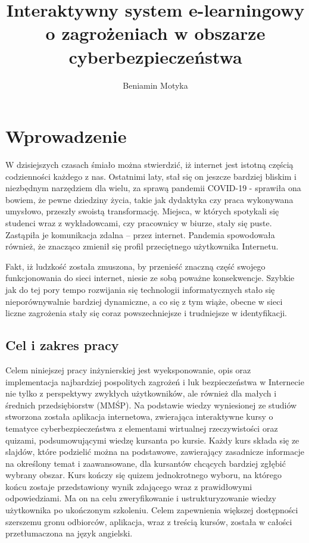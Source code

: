 \documentclass[12pt,twoside]{article}
\author{Beniamin Motyka}
\title{Interaktywny system e-learningowy o zagrożeniach w obszarze cyberbezpieczeństwa}
\begin{document}
\maketitle

\blankpage

\tableofcontents

\clearpage
\blankpage

\clearpage
\section{Wprowadzenie}

W dzisiejszych czasach śmiało można stwierdzić, iż	internet jest istotną częścią codzienności każdego z nas. Ostatnimi laty, stał się on jeszcze bardziej bliskim i niezbędnym narzędziem dla wielu, za sprawą pandemii COVID-19 - sprawiła ona bowiem, że pewne dziedziny życia, takie jak dydaktyka czy praca wykonywana umysłowo, przeszły swoistą transformację. Miejsca, w których spotykali się studenci wraz z wykładowcami, czy pracownicy w biurze, stały się puste. Zastąpiła je komunikacja zdalna -- przez internet. Pandemia spowodowała również, że znacząco zmienił się profil przeciętnego użytkownika Internetu.

Fakt, iż ludzkość została zmuszona, by przenieść znaczną część swojego funkcjonowania do sieci internet, niesie ze sobą poważne konsekwencje. Szybkie jak do tej pory tempo rozwijania się technologii informatycznych stało się nieporównywalnie bardziej dynamiczne, a co się z tym wiąże, obecne w sieci liczne zagrożenia stały się coraz powszechniejsze i trudniejsze w identyfikacji. 

\subsection{Cel i zakres pracy}

Celem niniejszej pracy inżynierskiej jest wyeksponowanie, opis oraz implementacja najbardziej pospolitych zagrożeń i luk bezpieczeństwa w Internecie nie tylko z perspektywy zwykłych użytkowników, ale również dla małych i średnich przedsiębiorstw (MMŚP). Na podstawie wiedzy wyniesionej ze studiów stworzona została aplikacja internetowa, zwierająca interaktywne kursy o tematyce cyberbezpieczeństwa z elementami wirtualnej rzeczywistości oraz quizami, podsumowującymi wiedzę kursanta po kursie. Każdy kurs składa się ze slajdów, które podzielić można na podstawowe, zawierający zasadnicze informacje na określony temat i zaawansowane, dla kursantów chcących bardziej zgłębić wybrany obszar. Kurs kończy się quizem jednokrotnego wyboru, na którego końcu zostaje przedstawiony wynik zdającego wraz z prawidłowymi odpowiedziami. Ma on na celu zweryfikowanie i ustrukturyzowanie wiedzy użytkownika po ukończonym szkoleniu. Celem zapewnienia większej dostępności szerszemu gronu odbiorców, aplikacja, wraz z treścią kursów, została w całości przetłumaczona na język angielski.
\end{document}
